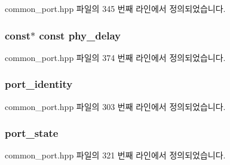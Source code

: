 common\+\_\+port.\+hpp 파일의 345 번째 라인에서 정의되었습니다.

\subsubsection[{\texorpdfstring{phy\+\_\+delay}{phy_delay}}]{ const$\ast$ const phy\+\_\+delay\hspace{0.3cm}{\ttfamily [protected]}}\hypertarget{class_common_port_aa00ef04a42536f5b6a5086467cd1e968}{}\label{class_common_port_aa00ef04a42536f5b6a5086467cd1e968}


common\+\_\+port.\+hpp 파일의 374 번째 라인에서 정의되었습니다.

\subsubsection[{\texorpdfstring{port\+\_\+identity}{port_identity}}]{ port\+\_\+identity\hspace{0.3cm}{\ttfamily [private]}}\hypertarget{class_common_port_a928a9e09d06b348120139e5cd2fcbcfe}{}\label{class_common_port_a928a9e09d06b348120139e5cd2fcbcfe}


common\+\_\+port.\+hpp 파일의 303 번째 라인에서 정의되었습니다.

\subsubsection[{\texorpdfstring{port\+\_\+state}{port_state}}]{ port\+\_\+state\hspace{0.3cm}{\ttfamily [private]}}\hypertarget{class_common_port_ae66554126902ed959a3b296ddd3204e8}{}\label{class_common_port_ae66554126902ed959a3b296ddd3204e8}


common\+\_\+port.\+hpp 파일의 321 번째 라인에서 정의되었습니다.

